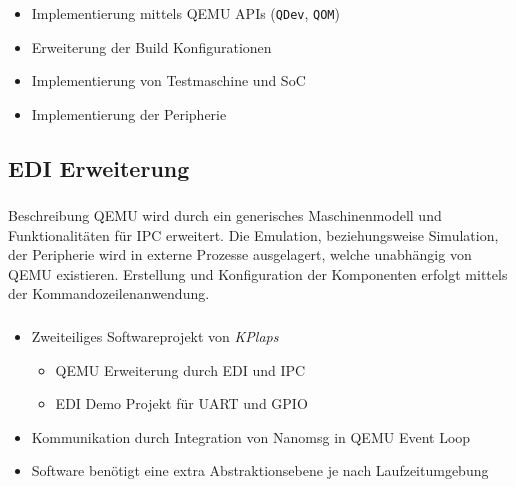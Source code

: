 \begin{frame}[fragile]
\frametitle{\insertsection}
\framesubtitle{\insertsubsection}

\begin{itemize}
    \item Implementierung mittels QEMU APIs (\texttt{QDev}, \texttt{QOM})
    \item Erweiterung der Build Konfigurationen
    \item Implementierung von Testmaschine und SoC
    \item Implementierung der Peripherie
\end{itemize}

\end{frame}

\subsection{EDI Erweiterung}

\begin{frame}[fragile]
\frametitle{\insertsection}
\framesubtitle{\insertsubsection}

\begin{block}{Beschreibung}
QEMU wird durch ein generisches Maschinenmodell und
Funktionalitäten für IPC erweitert.\newline
Die Emulation, beziehungsweise Simulation, der Peripherie wird in externe
Prozesse ausgelagert, welche unabhängig von QEMU existieren.\newline
Erstellung und Konfiguration der Komponenten erfolgt mittels der
Kommandozeilenanwendung.
\end{block}

\end{frame}

\begin{frame}[fragile]
\frametitle{\insertsection}
\framesubtitle{\insertsubsection}

\begin{itemize}
    \item Zweiteiliges Softwareprojekt von \textit{KPlaps}\cite{KplCodeDive}
        \begin{itemize}
            \item QEMU Erweiterung durch EDI und IPC
            \item EDI Demo Projekt für UART und GPIO
        \end{itemize}
    \item Kommunikation durch Integration von Nanomsg in QEMU Event Loop
    \item Software benötigt eine extra Abstraktionsebene je nach
        Laufzeitumgebung
\end{itemize}
\end{frame}

